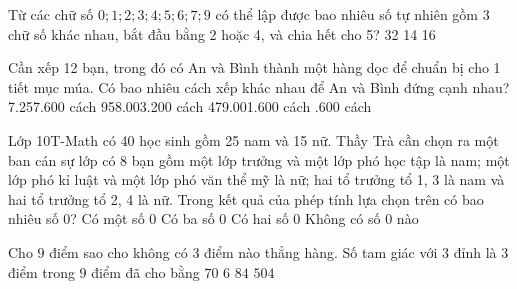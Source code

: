 \begin{ex}
 Từ các chữ số $0;1;2;3;4;5;6;7;9$ có thể lập được bao nhiêu số tự nhiên gồm 3 chữ số khác nhau, bắt đầu bằng 2 hoặc 4, và chia hết cho 5?
\choice
{32}
{14}
{}
{16}
\end{ex}
\begin{ex}
 Cần xếp 12 bạn, trong đó có An và Bình thành một hàng dọc để chuẩn bị cho 1 tiết mục múa. Có bao nhiêu cách xếp khác nhau để An và Bình đứng cạnh nhau?
\choice
{7.257.600 cách}
{958.003.200 cách}
{479.001.600 cách}
{.600 cách}
\end{ex}
\begin{ex}
 Lớp 10T-Math có 40 học sinh gồm 25 nam và 15 nữ. Thầy Trà cần chọn ra một ban cán sự lớp có 8 bạn gồm một lớp trưởng và một lớp phó học tập là nam; một lớp phó kỉ luật và một lớp phó văn thể mỹ là nữ; hai tổ trưởng tổ 1, 3 là nam và hai tổ trưởng tổ 2, 4 là nữ. Trong kết quả của phép tính lựa chọn trên có bao nhiêu số 0?
\choice
{Có một số 0}
{\True Có ba số 0}
{Có hai số 0}
{Không có số 0 nào}
\end{ex}
\begin{ex}
 Cho $9$ điểm sao cho không có 3 điểm nào thẳng hàng. Số tam giác với $3$ đỉnh là $3$ điểm trong $9$ điểm đã cho bằng 
\choice
{$ 70$}
{$6$}
{\True $84$}
{$504$}
\end{ex}
